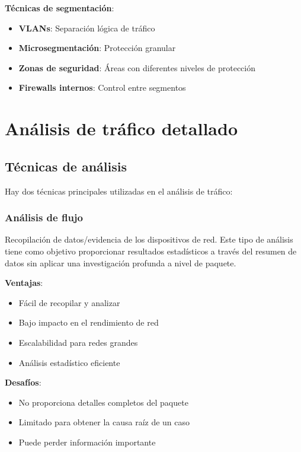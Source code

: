 \textbf{Técnicas de segmentación}:
\begin{itemize}
    \item \textbf{VLANs}: Separación lógica de tráfico
    \item \textbf{Microsegmentación}: Protección granular
    \item \textbf{Zonas de seguridad}: Áreas con diferentes niveles de protección
    \item \textbf{Firewalls internos}: Control entre segmentos
\end{itemize}

\section{Análisis de tráfico detallado}

\subsection{Técnicas de análisis}

Hay dos técnicas principales utilizadas en el análisis de tráfico:

\subsubsection{Análisis de flujo}

Recopilación de datos/evidencia de los dispositivos de red. Este tipo de análisis tiene como objetivo proporcionar resultados estadísticos a través del resumen de datos sin aplicar una investigación profunda a nivel de paquete.

\textbf{Ventajas}:
\begin{itemize}
    \item Fácil de recopilar y analizar
    \item Bajo impacto en el rendimiento de red
    \item Escalabilidad para redes grandes
    \item Análisis estadístico eficiente
\end{itemize}

\textbf{Desafíos}:
\begin{itemize}
    \item No proporciona detalles completos del paquete
    \item Limitado para obtener la causa raíz de un caso
    \item Puede perder información importante
\end{itemize}

